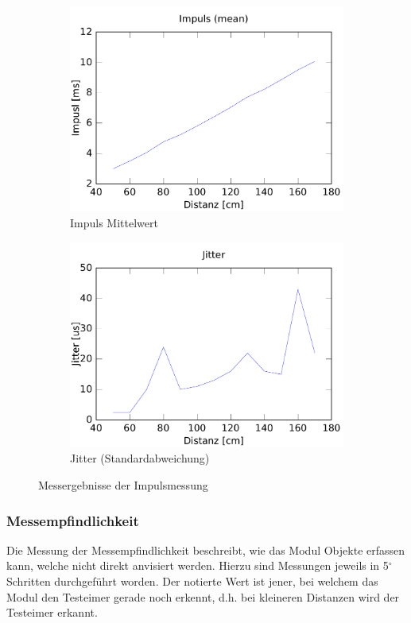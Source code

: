 \begin{figure}[h!]
	\centering
	\begin{subfigure}[b]{0.45\textwidth}
		\includegraphics[width=\textwidth]{../../fig/hc-sr04_accuracy.pdf}
		\caption{Impuls Mittelwert}
	\end{subfigure}
	\begin{subfigure}[b]{0.45\textwidth}
		\includegraphics[width=\textwidth]{../../fig/hc-sr04_jitter.pdf}
		\caption{Jitter (Standardabweichung)}
	\end{subfigure}
	\caption{Messergebnisse der Impulsmessung}
\end{figure}

\subsubsection{Messempfindlichkeit}
Die Messung der Messempfindlichkeit beschreibt, wie das Modul Objekte erfassen
kann, welche nicht direkt anvisiert werden. Hierzu sind Messungen jeweils in 
5$^\circ$ Schritten durchgeführt worden. Der notierte Wert ist jener, bei
welchem das Modul den Testeimer gerade noch erkennt, d.h. bei kleineren
Distanzen wird der Testeimer erkannt.

